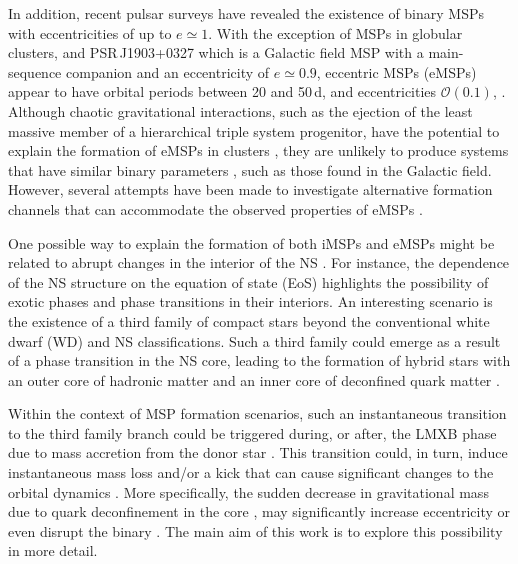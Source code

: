 \documentclass[main.tex]{subfiles}
\begin{document}
        
        In addition, recent pulsar surveys have revealed the existence of binary MSPs with eccentricities of up to $e \simeq 1$. With
        the exception of MSPs in globular clusters, and PSR\,J1903+0327 \citep{Champion:sci2008} which is a Galactic field MSP with a
        main-sequence companion and an eccentricity of $e\simeq0.9$, 
         eccentric MSPs (eMSPs) appear to have orbital periods between 20 and 50\,d, and eccentricities $\mathcal{O}(0.1)$, 
         \citep{Deneva:apj2013, Barr:mnras2013, Knispel:apj2015, Camilo:apj2015, Octau:aap2018, Stovall:apj2019}. 
        Although chaotic gravitational interactions, such as the ejection of the least massive member of a hierarchical triple system
        progenitor, have the potential to explain the formation of eMSPs in clusters \citep[e.g.,][]{2011MNRAS.412.2763F, 
        2011ApJ...734...55P},   they are unlikely to produce systems that have similar binary parameters \citep[see][]
        {Deneva:apj2013, Barr:mnras2013, Knispel:apj2015, Camilo:apj2015, Octau:aap2018}, such as those found in the Galactic field. 
        However, several attempts have been made to investigate alternative formation channels that can accommodate the observed properties of eMSPs \citep[e.g., see ][for an overivew of various eMSP formation scenarios]{Freire:mnras14, antoniadis:apjl14, Jiang:apj15, Jiang:raa2021, ginzburg:mnras21}. 
        
        One possible way to explain the formation of both iMSPs and eMSPs might be related to abrupt changes in the interior of the NS
        \citep{Freire:mnras14, Jiang:apj15, Alvarez-Castillo:2019apz}. For instance, the dependence of the NS structure on the
        equation of state (EoS) highlights the possibility of exotic phases and phase transitions in their interiors. An interesting
        scenario is the existence of a third family of compact stars \citep[see][]{Gerlach:1968zz}
        beyond the conventional  white dwarf (WD) and NS classifications. 
        Such a third family could emerge as a result of a phase transition in the NS core, leading to the formation of
        hybrid stars with an outer core of hadronic matter and an inner core of deconfined quark matter \citep[e.g.,][]
        {Schertler:2000xq,Benic:2014jia, Alvarez-Castillo:2019apz, 2021AN....342..234A}. 
        
        Within the context of MSP formation scenarios, such an instantaneous transition to the third family branch could be
        triggered during, or after, the LMXB phase due to mass accretion from the donor star \citep[see, e.g.,][]
        {Bejger:2016emu,Alvarez-Castillo:2019apz}. This transition could, in turn, induce instantaneous mass loss and/or a kick  that can cause significant changes to the orbital dynamics \citep{Jiang:apj15}. 
        More specifically, the sudden decrease in gravitational mass due to quark deconfinement in the core \citep[owing to the ``catastrophic rearrangement'' and strong compactification of matter when transitioning to the third-family branch which increases the gravitational binding energy, see ][]{Mishustin:2002xe}, may significantly increase eccentricity or even disrupt the binary \citep[see also][]{Jiang:raa2021}. The main aim of this work is to explore this possibility in more detail. 
        
\end{document}
